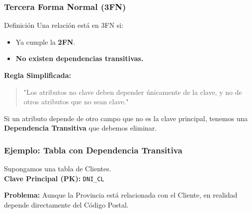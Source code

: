\documentclass{beamer}
\begin{document}
\begin{frame}
  \frametitle{Tercera Forma Normal (3FN)}

  \begin{alertblock}{Definición}
    Una relación está en 3FN si:
    \begin{itemize}
        \item Ya cumple la \textbf{2FN}.
        \item \textbf{No existen dependencias transitivas.}
    \end{itemize}
  \end{alertblock}

  \vspace{1em}
  \textbf{Regla Simplificada:}
  \begin{quote}
      "Los atributos no clave deben depender únicamente de la clave, y no de otros atributos que no sean clave."
  \end{quote}
  
  \small{Si un atributo depende de otro campo que no es la clave principal, tenemos una \textbf{Dependencia Transitiva} que debemos eliminar.}
\end{frame}

\begin{frame}
  \frametitle{Ejemplo: Tabla con Dependencia Transitiva}

  Supongamos una tabla de Clientes.
  \\ \textbf{Clave Principal (PK):} \texttt{DNI\_CL}

  \begin{center}
  \end{center}
  
  \vspace{0.5em}
  \small{\textbf{Problema:} Aunque la Provincia está relacionada con el Cliente, en realidad depende directamente del Código Postal.}
\end{frame}
\end{document}
